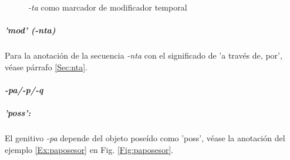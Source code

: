 \documentclass[a4paper,11pt,DIV12]{scrartcl}
\begin{document}
\begin{figure}
 \begin{center}
\end{center}
\caption{{\em -ta} como marcador de modificador temporal}\label{Fig:tatmp}
\end{figure}

\subparagraph{'mod' ({\em -nta})}

Para la anotaci\'on de la secuencia {\em -nta} con el significado de 'a trav\'es de, por', v\'ease p\'arrafo \ref{Sec:nta}.


\paragraph{{\em -pa/-p/-q}}
\subparagraph{'poss':} El genitivo {\em -pa} depende del objeto pose\'ido como 'poss', v\'ease la anotaci\'on del ejemplo \ref{Ex:paposesor} en Fig. \ref{Fig:paposesor}.
\end{document}
